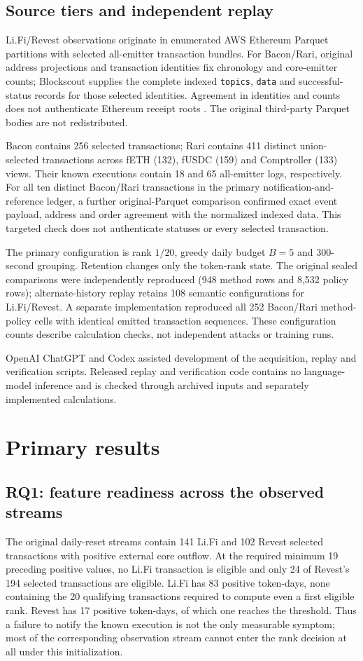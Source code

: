 \documentclass[preprint,12pt,authoryear]{elsarticle}
\begin{document}
\subsection{Source tiers and independent replay}
Li.Fi/Revest observations originate in enumerated AWS Ethereum Parquet partitions with selected all-emitter transaction bundles. For Bacon/Rari, original address projections and transaction identities fix chronology and core-emitter counts; Blockscout supplies the complete indexed \texttt{topics}, \texttt{data} and successful-status records for those selected identities. Agreement in identities and counts does not authenticate Ethereum receipt roots \citep{AWS2026Dataset}. The original third-party Parquet bodies are not redistributed.

Bacon contains 256 selected transactions; Rari contains 411 distinct union-selected transactions across fETH (132), fUSDC (159) and Comptroller (133) views. Their known executions contain 18 and 65 all-emitter logs, respectively. For all ten distinct Bacon/Rari transactions in the primary notification-and-reference ledger, a further original-Parquet comparison confirmed exact event payload, address and order agreement with the normalized indexed data. This targeted check does not authenticate statuses or every selected transaction.

The primary configuration is rank $1/20$, greedy daily budget $B=5$ and 300-second grouping. Retention changes only the token-rank state. The original sealed comparisons were independently reproduced (948 method rows and 8,532 policy rows); alternate-history replay retains 108 semantic configurations for Li.Fi/Revest. A separate implementation reproduced all 252 Bacon/Rari method-policy cells with identical emitted transaction sequences. These configuration counts describe calculation checks, not independent attacks or training runs.

OpenAI ChatGPT and Codex assisted development of the acquisition, replay and verification scripts. Released replay and verification code contains no language-model inference and is checked through archived inputs and separately implemented calculations.

\section{Primary results}\label{sec:results}
\subsection{RQ1: feature readiness across the observed streams}
The original daily-reset streams contain 141 Li.Fi and 102 Revest selected transactions with positive external core outflow. At the required minimum 19 preceding positive values, no Li.Fi transaction is eligible and only 24 of Revest's 194 selected transactions are eligible. Li.Fi has 83 positive token-days, none containing the 20 qualifying transactions required to compute even a first eligible rank. Revest has 17 positive token-days, of which one reaches the threshold. Thus a failure to notify the known execution is not the only measurable symptom; most of the corresponding observation stream cannot enter the rank decision at all under this initialization.
\end{document}
